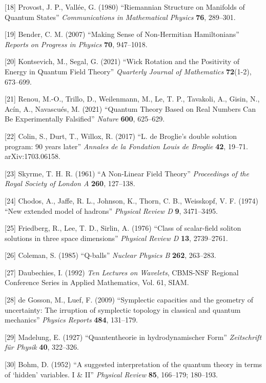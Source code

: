 \documentclass[
]{article}
\begin{document}
{[}18{]} Provost, J. P., Vallée, G. (1980) ``Riemannian Structure on
Manifolds of Quantum States'' \emph{Communications in Mathematical
Physics} \textbf{76}, 289--301.

{[}19{]} Bender, C. M. (2007) ``Making Sense of Non-Hermitian
Hamiltonians'' \emph{Reports on Progress in Physics} \textbf{70},
947--1018.

{[}20{]} Kontsevich, M., Segal, G. (2021) ``Wick Rotation and the
Positivity of Energy in Quantum Field Theory'' \emph{Quarterly Journal
of Mathematics} \textbf{72}(1-2), 673--699.

{[}21{]} Renou, M.-O., Trillo, D., Weilenmann, M., Le, T. P., Tavakoli,
A., Gisin, N., Acín, A., Navascués, M. (2021) ``Quantum Theory Based on
Real Numbers Can Be Experimentally Falsified'' \emph{Nature}
\textbf{600}, 625--629.

{[}22{]} Colin, S., Durt, T., Willox, R. (2017) ``L. de Broglie's double
solution program: 90 years later'' \emph{Annales de la Fondation Louis
de Broglie} \textbf{42}, 19--71. arXiv:1703.06158.

{[}23{]} Skyrme, T. H. R. (1961) ``A Non-Linear Field Theory''
\emph{Proceedings of the Royal Society of London A} \textbf{260},
127--138.

{[}24{]} Chodos, A., Jaffe, R. L., Johnson, K., Thorn, C. B., Weisskopf,
V. F. (1974) ``New extended model of hadrons'' \emph{Physical Review D}
\textbf{9}, 3471--3495.

{[}25{]} Friedberg, R., Lee, T. D., Sirlin, A. (1976) ``Class of
scalar-field soliton solutions in three space dimensions''
\emph{Physical Review D} \textbf{13}, 2739--2761.

{[}26{]} Coleman, S. (1985) ``Q-balls'' \emph{Nuclear Physics B}
\textbf{262}, 263--283.

{[}27{]} Daubechies, I. (1992) \emph{Ten Lectures on Wavelets}, CBMS-NSF
Regional Conference Series in Applied Mathematics, Vol. 61, SIAM.

{[}28{]} de Gosson, M., Luef, F. (2009) ``Symplectic capacities and the
geometry of uncertainty: The irruption of symplectic topology in
classical and quantum mechanics'' \emph{Physics Reports} \textbf{484},
131--179.

{[}29{]} Madelung, E. (1927) ``Quantentheorie in hydrodynamischer Form''
\emph{Zeitschrift für Physik} \textbf{40}, 322--326.

{[}30{]} Bohm, D. (1952) ``A suggested interpretation of the quantum
theory in terms of `hidden' variables. I \& II'' \emph{Physical Review}
\textbf{85}, 166--179; 180--193.
\end{document}
